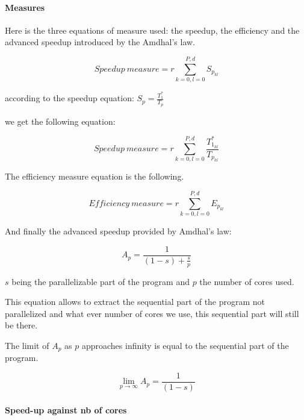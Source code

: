 \documentclass{sig-alternate}
\begin{document}


\paragraph{Measures}


Here is the three equations of measure used: the speedup, the efficiency and the advanced speedup introduced by the Amdhal's law.

$$Speedup\ measure = r \sum^{P,d}_{k=0,l=0} S_{p_{kl}}$$

according to the speedup equation: $S_p = \frac{T^*_1}{T_p}$

we get the following equation:

$$Speedup\ measure = r \sum^{P,d}_{k=0,l=0} \frac{T^*_{1_{kl}}}{T_{p_{kl}}}$$

The efficiency measure equation is the following.

$$Efficiency\ measure = r \sum^{P,d}_{k=0,l=0} E_{p_{kl}}$$

And finally the advanced speedup provided by Amdhal's law:

$$A_p = \frac{1}{(1-s) + \frac{s}{p}}$$

$s$ being the parallelizable part of the program and $p$ the number of cores used.

This equation allows to extract the sequential part of the program not parallelized and what ever number of cores we use, this sequential part will still be there.

The limit of $A_p$ as $p$ approaches infinity is equal to the sequential part of the program.

$$\lim_{p \to \infty} A_p = \frac{1}{(1-s)}$$

\paragraph{Speed-up against nb of cores} %
\end{document}
